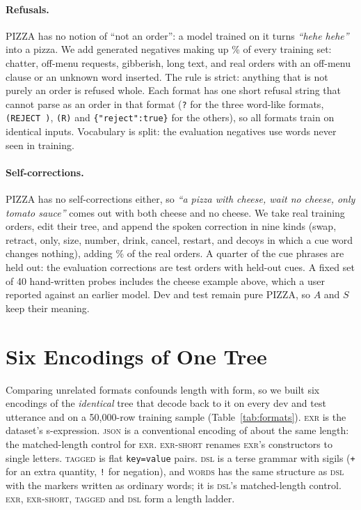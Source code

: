 \documentclass[11pt]{article}
\newcommand{\fmt}[1]{\textsc{\lowercase{#1}}}
\newcommand{\code}[1]{\texttt{#1}}
\begin{document}
\paragraph{Refusals.}
PIZZA has no notion of ``not an order'': a model trained on it turns
\emph{``hehe hehe''} into a pizza. We add generated negatives making up
\negFrac{}\% of every training set: chatter, off-menu requests, gibberish, long
text, and real orders with an off-menu clause or an unknown word inserted. The
rule is strict: anything that is not purely an order is refused whole. Each format
has one short refusal string that cannot parse as an order in that format
(\code{?} for the three word-like formats, \code{(REJECT )}, \code{(R)} and
\code{\{"reject":true\}} for the others), so all formats train on identical inputs.
Vocabulary is split: the \nNeg{} evaluation negatives use words never seen in
training.

\paragraph{Self-corrections.}
PIZZA has no self-corrections either, so \emph{``a pizza with cheese, wait no
cheese, only tomato sauce''} comes out with both cheese and no cheese. We take
real training orders, edit their tree, and append the spoken correction in nine
kinds (swap, retract, only, size, number, drink, cancel, restart, and decoys in
which a cue word changes nothing), adding \corFrac{}\% of the real orders. A
quarter of the cue phrases are held out: the \nCor{} evaluation corrections are
test orders with held-out cues. A fixed set of 40 hand-written probes includes the
cheese example above, which a user reported against an earlier model. Dev and test
remain pure PIZZA, so $A$ and $S$ keep their meaning.

\section{Six Encodings of One Tree}
\label{sec:formats}

\begin{table}[t]
\centering
\footnotesize
\setlength{\tabcolsep}{3pt}
\resizebox{\columnwidth}{!}{}
\caption{One test order, \emph{``\exUtterance''}, in the six encodings (long
targets truncated). Tokens are Qwen's.}
\label{tab:formats}
\end{table}

Comparing unrelated formats confounds length with form, so we built six encodings
of the \emph{identical} tree that decode back to it on every dev and test utterance
and on a 50{,}000-row training sample (Table~\ref{tab:formats}). \fmt{EXR} is the
dataset's s-expression. \fmt{JSON} is a conventional encoding of about the same
length: the matched-length control for \fmt{EXR}. \fmt{EXR-short} renames
\fmt{EXR}'s constructors to single letters. \fmt{TAGGED} is flat
\code{key=value} pairs. \fmt{DSL} is a terse grammar with sigils (\code{+} for an
extra quantity, \code{!} for negation), and \fmt{WORDS} has the same structure as
\fmt{DSL} with the markers written as ordinary words; it is \fmt{DSL}'s
matched-length control. \fmt{EXR}, \fmt{EXR-short}, \fmt{TAGGED} and \fmt{DSL}
form a length ladder.
\end{document}
